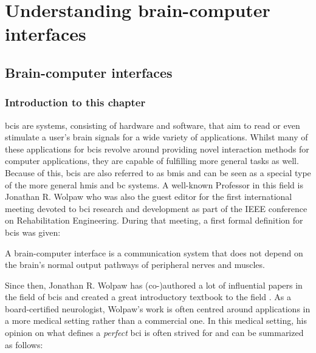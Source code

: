 
\part{Understanding brain-computer interfaces}


\glsresetall

\chapter{Brain-computer interfaces}
\label{ch:bci}

\section{Introduction to this chapter}
\label{sec:bci_introduction}

\Glspl{bci} are systems, consisting of hardware and software, that aim to read or even stimulate a user's brain signals for a wide variety of applications.
Whilst many of these applications for \glspl{bci} revolve around providing novel interaction methods for computer applications, they are capable of fulfilling more general tasks as well.
Because of this, \glspl{bci} are also referred to as \glspl{bmi} and can be seen as a special type of the more general \glspl{hmi} and \gls{bc} systems.
A well-known Professor in this field is Jonathan R. Wolpaw who was also the guest editor for the first international meeting devoted to \gls{bci} research and development as part of the IEEE conference on Rehabilitation Engineering.
During that meeting, a first formal definition for \glspl{bci} was given:

\setlength{\epigraphwidth}{0.9\textwidth}
\epigraph{A brain-computer interface is a communication system that does not depend on the brain’s normal output pathways of peripheral nerves and muscles.}{\textit{\citet{first_bci_meeting}}}

Since then, Jonathan R. Wolpaw has (co-)authored a lot of influential papers in the field of \glspl{bci} \citep{bci_rehabilitation, bci_in_medicine, first_bci_meeting} and created a great introductory textbook to the field \citep{bci_book}.
As a board-certified neurologist, Wolpaw's work is often centred around applications in a more medical setting rather than a commercial one. In this medical setting, his opinion on what defines a \textit{perfect} \gls{bci} is often strived for and can be summarized as follows:


